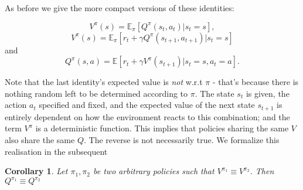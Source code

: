\documentclass[11pt]{article} %
\newtheorem{cor}{Corollary}
\begin{document}
\newpage

As before we give the more compact versions of these identities:

$$ V^{\pi}(s) =  \mathbb{E}_{\pi}[Q^{\pi}(s_{t},a_{t}) | s_t = s ], $$
$$ V^{\pi}(s) =  \mathbb{E}_{\pi}[r_t + \gamma Q^{\pi}(s_{t+1},a_{t+1}) | s_t = s ] $$ and 
$$ Q^{\pi}(s,a) = \mathbb{E}[r_t + \gamma V^{\pi}(s_{t+1}) | s_t = s, a_t = a]. $$

Note that the last identity's expected value is \textit{not} w.r.t $\pi$ - that's because there is nothing random left to be determined according to $\pi$. The state $s_t$ is given, the action $a_t$ specified and fixed, and the expected value of the next state $s_{t+1}$ is entirely dependent on how the environment reacts to this combination; and the term $V^{\pi}$ is a deterministic function. This implies that policies sharing the same $V$ also share the same $Q$. The reverse is not necessarily true. We formalize this realisation in the subsequent

\begin{cor}
	Let $\pi_1,\pi_2$ be two arbitrary policies such that $V^{\pi_1} \equiv V^{\pi_2}$. Then $Q^{\pi_1} \equiv Q^{\pi_2}$
\end{cor}
\end{document}
